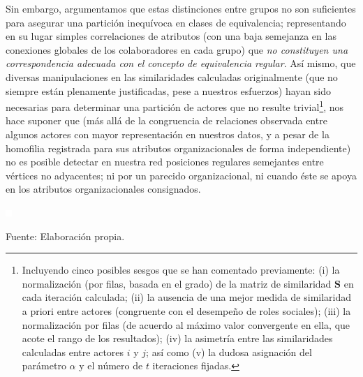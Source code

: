 \documentclass[letterpaper, 11pt]{book}
\theoremstyle{definition}
\theoremstyle{remark}
\begin{document}
Sin embargo, argumentamos que estas distinciones entre grupos no son suficientes para asegurar una partición inequívoca en clases de equivalencia; representando en su lugar simples correlaciones de atributos (con una baja semejanza en las conexiones globales de los colaboradores en cada grupo) que \emph{no constituyen una correspondencia adecuada con el concepto de equivalencia regular}. 
Así mismo, que diversas manipulaciones en las similaridades calculadas originalmente (que no siempre están plenamente justificadas, pese a nuestros esfuerzos) hayan sido necesarias para determinar una partición de actores que no resulte trivial\footnote{
    Incluyendo cinco posibles sesgos que se han comentado previamente: 
    (i) la normalización (por filas, basada en el grado) de la matriz de similaridad $\mathbf{S}$ en cada iteración calculada; 
    (ii) la ausencia de una mejor medida de similaridad a priori entre actores (congruente con el desempeño de roles sociales); 
    (iii) la normalización por filas (de acuerdo al máximo valor convergente en ella, que acote el rango de los resultados); 
    (iv) la asimetría entre las similaridades calculadas entre actores $i$ y $j$; 
    así como (v) la dudosa asignación del parámetro $\alpha$ y el número de $t$ iteraciones fijadas. 
}, nos hace suponer que (más allá de la congruencia de relaciones observada entre algunos actores con mayor representación en nuestros datos, y a pesar de la homofilia registrada para sus atributos organizacionales de forma independiente) no es posible detectar en nuestra red posiciones regulares semejantes entre vértices no adyacentes; ni por un parecido organizacional, ni cuando éste se apoya en los atributos organizacionales consignados. 


\begin{minipage}{\linewidth}
\centering
{} \label{5_25_hclust_bloquesReg}

\includegraphics[scale=0.1]{img/null.png}
\vspace{32em}
\par\bigskip
\small Fuente: Elaboración propia.
\end{minipage}\bigskip
\end{document}
